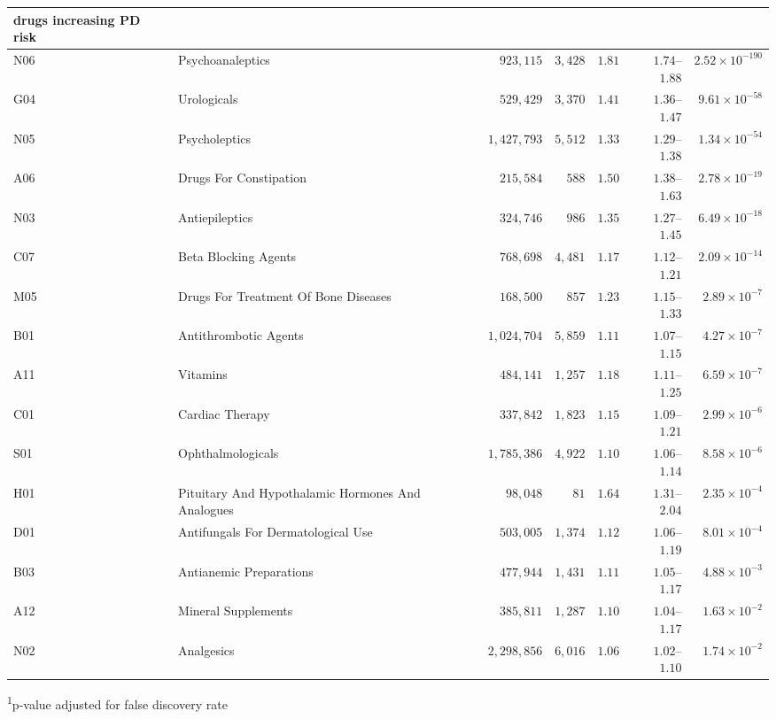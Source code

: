 \begin{longtable}{llrrrrr}
\midrule
\multicolumn{1}{l}{drugs increasing PD risk} \\ 
\midrule
N06 & Psychoanaleptics & $923,115$ & $3,428$ & $1.81$ & $1.74$–$1.88$ & $2.52 \times 10^{-190}$ \\ 
G04 & Urologicals & $529,429$ & $3,370$ & $1.41$ & $1.36$–$1.47$ & $9.61 \times 10^{-58}$ \\ 
N05 & Psycholeptics & $1,427,793$ & $5,512$ & $1.33$ & $1.29$–$1.38$ & $1.34 \times 10^{-54}$ \\ 
A06 & Drugs For Constipation & $215,584$ & $588$ & $1.50$ & $1.38$–$1.63$ & $2.78 \times 10^{-19}$ \\ 
N03 & Antiepileptics & $324,746$ & $986$ & $1.35$ & $1.27$–$1.45$ & $6.49 \times 10^{-18}$ \\ 
C07 & Beta Blocking Agents & $768,698$ & $4,481$ & $1.17$ & $1.12$–$1.21$ & $2.09 \times 10^{-14}$ \\ 
M05 & Drugs For Treatment Of Bone Diseases & $168,500$ & $857$ & $1.23$ & $1.15$–$1.33$ & $2.89 \times 10^{-7}$ \\ 
B01 & Antithrombotic Agents & $1,024,704$ & $5,859$ & $1.11$ & $1.07$–$1.15$ & $4.27 \times 10^{-7}$ \\ 
A11 & Vitamins & $484,141$ & $1,257$ & $1.18$ & $1.11$–$1.25$ & $6.59 \times 10^{-7}$ \\ 
C01 & Cardiac Therapy & $337,842$ & $1,823$ & $1.15$ & $1.09$–$1.21$ & $2.99 \times 10^{-6}$ \\ 
S01 & Ophthalmologicals & $1,785,386$ & $4,922$ & $1.10$ & $1.06$–$1.14$ & $8.58 \times 10^{-6}$ \\ 
H01 & Pituitary And Hypothalamic Hormones And Analogues & $98,048$ & $81$ & $1.64$ & $1.31$–$2.04$ & $2.35 \times 10^{-4}$ \\ 
D01 & Antifungals For Dermatological Use & $503,005$ & $1,374$ & $1.12$ & $1.06$–$1.19$ & $8.01 \times 10^{-4}$ \\ 
B03 & Antianemic Preparations & $477,944$ & $1,431$ & $1.11$ & $1.05$–$1.17$ & $4.88 \times 10^{-3}$ \\ 
A12 & Mineral Supplements & $385,811$ & $1,287$ & $1.10$ & $1.04$–$1.17$ & $1.63 \times 10^{-2}$ \\ 
N02 & Analgesics & $2,298,856$ & $6,016$ & $1.06$ & $1.02$–$1.10$ & $1.74 \times 10^{-2}$ \\ 
\bottomrule
\end{longtable}
\begin{minipage}{\linewidth}
\textsuperscript{1}p-value adjusted for false discovery rate\\
\end{minipage}


